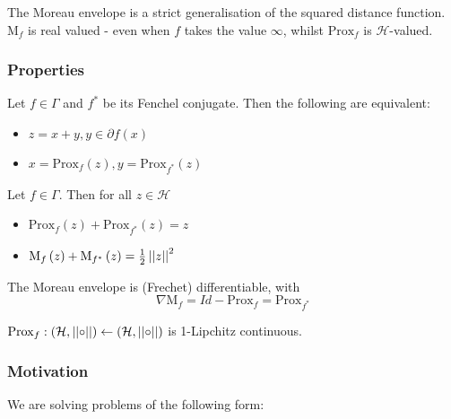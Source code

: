 The Moreau envelope is a strict generalisation of the squared distance function. \(\mathrm{M}_f\) is real valued - even when \(f\) takes the value \(\infty\), whilst \(\mathrm{Prox}_f \) is \(\mathcal{H}\)-valued. 

\subsubsection{Properties}
\begin{theorem}[Moreau '65]
Let \(f \in \Gamma\) and \(f^*\) be its Fenchel conjugate. Then the following are equivalent:
\begin{itemize}
\item \(z = x+y, y \in \partial f\left(x\right)\)
\item \(x = \mathrm{Prox}_f\left(z\right), y = \mathrm{Prox}_{f^*}\left(z\right)  \)
\end{itemize}
\end{theorem}

\begin{theorem}
Let \(f \in \Gamma\). Then for all \(z \in \mathcal{H}\)
\begin{itemize}
\item \( \mathrm{Prox}_f\left(z\right) + \mathrm{Prox}_{f^*}\left(z\right) = z   \)
\item \( \mathrm{M}_f\left(z\right)  + \mathrm{M}_{f^*}\left(z\right)  = \frac{1}{2}\left|\left|z\right|\right|^2 \)
\end{itemize}
\end{theorem}

\begin{theorem}
The Moreau envelope is (Frechet) differentiable, with 
\begin{equation}
\nabla \mathrm{M}_f = Id - \mathrm{Prox}_{f} = \mathrm{Prox}_{f^*}
\end{equation}
\end{theorem}

\begin{theorem}
\( \mathrm{Prox}_f : \left(\mathcal{H}, \left|\left|\circ\right|\right|\right) \leftarrow \left(\mathcal{H}, \left|\left|\circ\right|\right|\right) \) is 1-Lipchitz continuous.
\end{theorem}

\subsubsection{Motivation}
We are solving problems of the following form:

